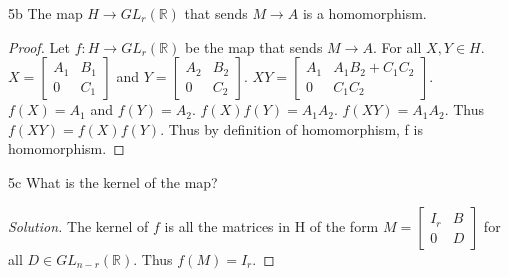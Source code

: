 \documentclass{article}
\newcommand{\R}{\mathbb{R}}
\newenvironment{solution}
{\renewcommand\qedsymbol{$\blacksquare$}\begin{proof}[Solution]}
{\end{proof}}
\begin{document}
\begin{claim}{5b}
   The map $H \to GL_r(\R)$ that sends $M\to A$ is a homomorphism.
\end{claim}
\begin{proof}
    Let $f: H \to GL_r(\R)$ be the map that sends $M\to A$. For all $X, Y \in H$. $X = \begin{bmatrix}
        A_1 & B_1 \\
        0 & C_1
    \end{bmatrix}$ and $Y = \begin{bmatrix}
        A_2 & B_2 \\
        0 & C_2
    \end{bmatrix}$. $XY = \begin{bmatrix}
        A_1 & A_1B_2 + C_1C_2 \\
        0 & C_1C_2
    \end{bmatrix}$. $f(X) = A_1$ and $f(Y) = A_2$. $f(X)f(Y) = A_1A_2$. $f(XY) = A_1A_2$. Thus $f(XY) = f(X)f(Y)$. Thus by definition of homomorphism, f is homomorphism.
\end{proof}

\begin{PROB}{5c}\label{Problem 5c.}
    What is the kernel of the map?
\end{PROB}
\begin{solution}
    The kernel of $f$ is all the matrices in H of the form $M = \begin{bmatrix}
        I_r & B \\
        0 & D
    \end{bmatrix}$ for all $D \in GL_{n-r}(\R)$. Thus $f(M) = I_r$.
\end{solution}

\bigskip
\end{document}
